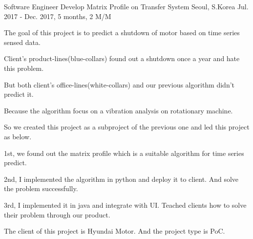\begin{cventries}
  \cventry
    {Software Engineer} %
    {Develop Matrix Profile on Transfer System} %
    {Seoul, S.Korea} %
    {Jul. 2017 - Dec. 2017, 5 months, 2 M/M} %
    {
      \begin{cvitems} %
        \item {The goal of this project is to predict a shutdown of motor based on time series sensed data.}
        \item {Client's product-lines(blue-collars) found out a shutdown once a year and hate this problem.}
        \item {But both client's office-lines(white-collars) and our previous algorithm didn't predict it.}
        \item {Because the algorithm focus on a vibration analysis on rotationary machine.}
        \item {So we created this project as a subproject of the previous one and led this project as below.}
        \item {1st, we found out the matrix profile which is a suitable algorithm for time series predict.}        
        \item {2nd, I implemented the algorithm in python and deploy it to client. And solve the problem successfully.}
        \item {3rd, I implemented it in java and integrate with UI. Teached clients how to solve their problem through our product.}
        \item {The client of this project is Hyundai Motor. And the project type is PoC.}
      \end{cvitems}
    }


\end{cventries}
